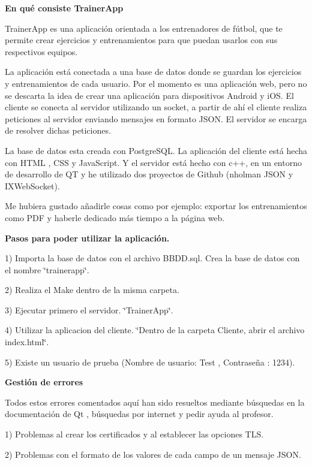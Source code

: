 



{\bfseries En qué consiste Trainer\+App}

Trainer\+App es una aplicación orientada a los entrenadores de fútbol, que te permite crear ejercicios y entrenamientos para que puedan usarlos con sus respectivos equipos.

La aplicación está conectada a una base de datos donde se guardan los ejercicios y entrenamientos de cada usuario. Por el momento es una aplicación web, pero no se descarta la idea de crear una aplicación para dispositivos Android y i\+OS. El cliente se conecta al servidor utilizando un socket, a partir de ahí el cliente realiza peticiones al servidor enviando mensajes en formato J\+S\+ON. El servidor se encarga de resolver dichas peticiones.

La base de datos esta creada con Postgre\+S\+QL. La aplicación del cliente está hecha con H\+T\+ML , C\+SS y Java\+Script. Y el servidor está hecho con c++, en un entorno de desarrollo de QT y he utilizado dos proyectos de Github (nholman J\+S\+ON y I\+X\+Web\+Socket).

Me hubiera gustado añadirle cosas como por ejemplo\+: exportar los entrenamientos como P\+DF y haberle dedicado más tiempo a la página web.

{\bfseries Pasos para poder utilizar la aplicación.}

1) Importa la base de datos con el archivo B\+B\+D\+D.\+sql. Crea la base de datos con el nombre \char`\"{}trainerapp\char`\"{}.

2) Realiza el Make dentro de la misma carpeta.

3) Ejecutar primero el servidor. \char`\"{}\+Trainer\+App\char`\"{}.

4) Utilizar la aplicacion del cliente. \char`\"{}\+Dentro de la carpeta Cliente, abrir el archivo index.\+html\char`\"{}.

5) Existe un usuario de prueba (Nombre de usuario\+: Test , Contraseña \+: 1234).

{\bfseries Gestión de errores}

Todos estos errores comentados aquí han sido resueltos mediante búsquedas en la documentación de Qt , búsquedas por internet y pedir ayuda al profesor.

1) Problemas al crear los certificados y al establecer las opciones T\+LS.

2) Problemas con el formato de los valores de cada campo de un mensaje J\+S\+ON.

